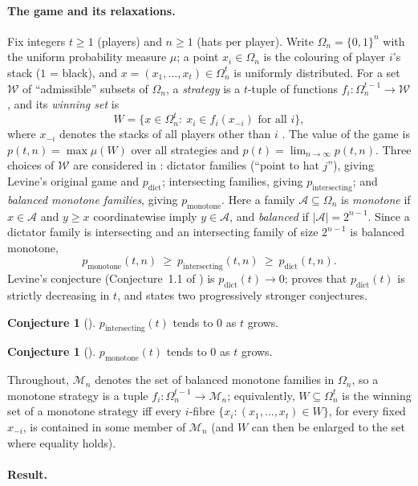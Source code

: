 \documentclass[11pt,a4paper]{article}
\theoremstyle{plain}
\theoremstyle{definition}
\newtheorem{conjecture}[theorem]{Conjecture}
\theoremstyle{remark}
\newcommand{\cA}{\mathcal A}
\newcommand{\cM}{\mathcal M}
\newcommand{\cW}{\mathcal W}
\newcommand{\pmon}{p_{\mathrm{monotone}}}
\newcommand{\pint}{p_{\mathrm{intersecting}}}
\newcommand{\pdict}{p_{\mathrm{dict}}}
\newcommand{\Om}{\Omega}
\begin{document}
\paragraph{The game and its relaxations.}
Fix integers $t\ge1$ (players) and $n\ge1$ (hats per player). Write $\Om_n=\{0,1\}^n$ with the uniform probability measure $\mu$; a point $x_i\in\Om_n$ is the colouring of player $i$'s stack ($1$ = black), and $x=(x_1,\dots,x_t)\in\Om_n^t$ is uniformly distributed. For a set $\cW$ of ``admissible'' subsets of $\Om_n$, a \emph{strategy} is a $t$-tuple of functions $f_i:\Om_n^{t-1}\to\cW$, and its \emph{winning set} is
\[
 W=\{x\in\Om_n^t:\ x_i\in f_i(x_{-i})\text{ for all }i\},
\]
where $x_{-i}$ denotes the stacks of all players other than $i$ \cite[Section~2]{AFKK}. The value of the game is $p(t,n)=\max\mu(W)$ over all strategies and $p(t)=\lim_{n\to\infty}p(t,n)$. Three choices of $\cW$ are considered in \cite{AFKK}: dictator families (``point to hat $j$''), giving Levine's original game and $\pdict$; intersecting families, giving $\pint$; and \emph{balanced monotone families}, giving $\pmon$. Here a family $\cA\subseteq\Om_n$ is \emph{monotone} if $x\in\cA$ and $y\ge x$ coordinatewise imply $y\in\cA$, and \emph{balanced} if $|\cA|=2^{n-1}$. Since a dictator family is intersecting and an intersecting family of size $2^{n-1}$ is balanced monotone,
\[
 \pmon(t,n)\ \ge\ \pint(t,n)\ \ge\ \pdict(t,n).
\]
Levine's conjecture (Conjecture~1.1 of \cite{AFKK}) is $\pdict(t)\to0$; \cite{AFKK} proves that $\pdict(t)$ is strictly decreasing in $t$, and states two progressively stronger conjectures.

\begin{conjecture}[{\cite[Conjecture~2.1]{AFKK}}]\label{conj:21}
$\pint(t)$ tends to $0$ as $t$ grows.
\end{conjecture}

\begin{conjecture}[{\cite[Conjecture~2.2]{AFKK}}]\label{conj:22}
$\pmon(t)$ tends to $0$ as $t$ grows.
\end{conjecture}

Throughout, $\cM_n$ denotes the set of balanced monotone families in $\Om_n$, so a monotone strategy is a tuple $f_i:\Om_n^{t-1}\to\cM_n$; equivalently, $W\subseteq\Om_n^t$ is the winning set of a monotone strategy iff every $i$-fibre $\{x_i:(x_1,\dots,x_t)\in W\}$, for every fixed $x_{-i}$, is contained in some member of $\cM_n$ (and $W$ can then be enlarged to the set where equality holds).

\paragraph{Result.}
\end{document}
